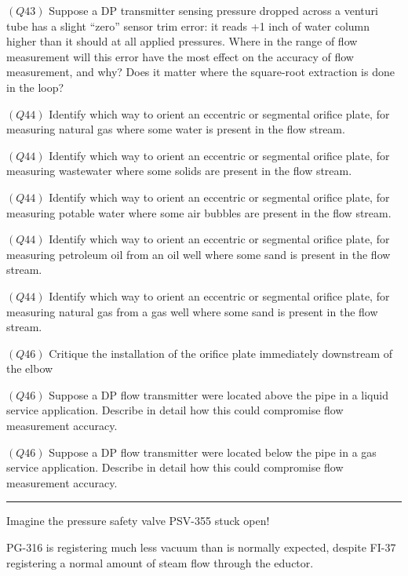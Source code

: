 \medskip
\item{$(Q43)$} Suppose a DP transmitter sensing pressure dropped across a venturi tube has a slight ``zero'' sensor trim error: it reads +1 inch of water column higher than it should at all applied pressures.  Where in the range of flow measurement will this error have the most effect on the accuracy of flow measurement, and why?  Does it matter where the square-root extraction is done in the loop?
\item{$(Q44)$} Identify which way to orient an eccentric or segmental orifice plate, for measuring natural gas where some water is present in the flow stream.
\item{$(Q44)$} Identify which way to orient an eccentric or segmental orifice plate, for measuring wastewater where some solids are present in the flow stream.
\item{$(Q44)$} Identify which way to orient an eccentric or segmental orifice plate, for measuring potable water where some air bubbles are present in the flow stream.
\item{$(Q44)$} Identify which way to orient an eccentric or segmental orifice plate, for measuring petroleum oil from an oil well where some sand is present in the flow stream.
\item{$(Q44)$} Identify which way to orient an eccentric or segmental orifice plate, for measuring natural gas from a gas well where some sand is present in the flow stream.
\item{$(Q46)$} Critique the installation of the orifice plate immediately downstream of the elbow
\item{$(Q46)$} Suppose a DP flow transmitter were located above the pipe in a liquid service application.  Describe in detail how this could compromise flow measurement accuracy.
\item{$(Q46)$} Suppose a DP flow transmitter were located below the pipe in a gas service application.  Describe in detail how this could compromise flow measurement accuracy.
\medskip


\filbreak \vskip 5pt \hrule \vskip 5pt  \vskip 10pt

Imagine the pressure safety valve PSV-355 stuck open!

\vskip 10pt

PG-316 is registering much less vacuum than is normally expected, despite FI-37 registering a normal amount of steam flow through the eductor.




\bye



